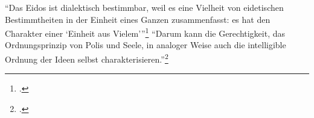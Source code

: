 \enquote{Das Eidos ist dialektisch bestimmbar, weil es eine Vielheit von eidetischen Bestimmtheiten in der Einheit eines Ganzen zusammenfasst: es hat den Charakter einer \enquote{Einheit aus Vielem}}\footcite[][S. 240]{halfwassenaufstieg2006}
\enquote{Darum kann die Gerechtigkeit, das Ordnungsprinzip von Polis und Seele, in analoger Weise auch die intelligible Ordnung der Ideen selbst charakterisieren.}\footcite[][S. 242]{halfwassenaufstieg2006}
